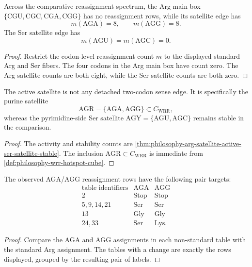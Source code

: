 \begin{theorem}
\label{thm:philosophy-arg-satellite-active-ser-satellite-stable}
Across the comparative reassignment spectrum, the Arg main box
$\{\mathrm{CGU},\mathrm{CGC},\mathrm{CGA},\mathrm{CGG}\}$ has no
reassignment rows, while its satellite edge has
$$
  m(\mathrm{AGA})=8,
  \qquad
  m(\mathrm{AGG})=8.
$$
The Ser satellite edge has
$$
  m(\mathrm{AGU})=m(\mathrm{AGC})=0.
$$
\end{theorem}
\begin{proof}
Restrict the codon-level reassignment count $m$ to the displayed
standard Arg and Ser fibers. The four codons in the Arg main box have
count zero. The Arg satellite counts are both eight, while the Ser
satellite counts are both zero.
\end{proof}

\begin{corollary}
\label{cor:philosophy-agr-active-purine-satellite}
The active satellite is not any detached two-codon sense edge. It is
specifically the purine satellite
$$
  \mathrm{AGR}=\{\mathrm{AGA},\mathrm{AGG}\}\subset C_{\mathrm{WRR}},
$$
whereas the pyrimidine-side Ser satellite
$\mathrm{AGY}=\{\mathrm{AGU},\mathrm{AGC}\}$ remains stable in the
comparison.
\end{corollary}
\begin{proof}
The activity and stability counts are
\autoref{thm:philosophy-arg-satellite-active-ser-satellite-stable}.
The inclusion $\mathrm{AGR}\subset C_{\mathrm{WRR}}$ is immediate from
\autoref{def:philosophy-wrr-hotspot-cube}.
\end{proof}

\begin{theorem}
\label{thm:philosophy-aga-agg-reassignment-targets}
The observed AGA/AGG reassignment rows have the following pair targets:
$$
\begin{array}{c|c|c}
  \text{table identifiers} & \mathrm{AGA} & \mathrm{AGG}\\
\hline
  2 & \mathrm{Stop} & \mathrm{Stop}\\
  5,9,14,21 & \mathrm{Ser} & \mathrm{Ser}\\
  13 & \mathrm{Gly} & \mathrm{Gly}\\
  24,33 & \mathrm{Ser} & \mathrm{Lys}.
\end{array}
$$
\end{theorem}
\begin{proof}
Compare the AGA and AGG assignments in each non-standard table with the
standard Arg assignment. The tables with a change are exactly the rows
displayed, grouped by the resulting pair of labels.
\end{proof}

